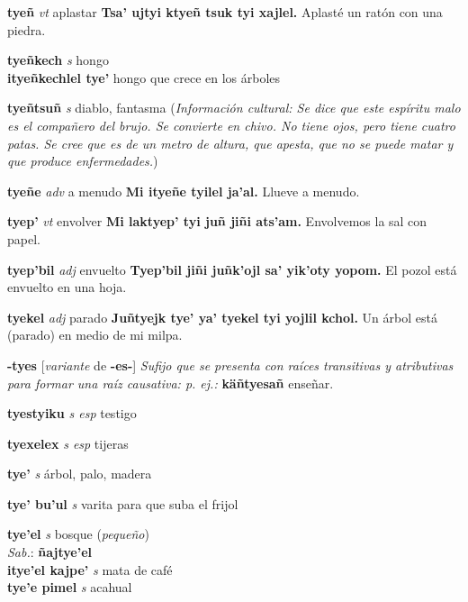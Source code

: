 \documentclass[10pt]{scrbook}
\newcommand{\entry}[1]{\textbf{#1}}
\newcommand{\nontranslationdef}[1]{\textit{#1}}
\newcommand{\partofspeech}[1]{\textit{#1}}
\newcommand{\spanishtranslation}[1]{#1}
\newcommand{\clarification}[1]{(\textit{#1})}
\newcommand{\cholexample}[1]{\textbf{#1}}
\newcommand{\exampletranslation}[1]{#1}
\newcommand{\dialectvariant}[1]{\\\textit{#1}:}
\newcommand{\dialectword}[1]{\textbf{#1}}
\newcommand{\culturalinformation}[1]{(\textit{#1})}
\newcommand{\secondaryentry}[1]{\\\textbf{#1}}
\newcommand{\secondpartofspeech}[1]{\textit{#1}}
\newcommand{\secondtranslation}[1]{#1}
\newcommand{\conjugationtense}[1]{[\textit{#1}}
\newcommand{\conjugationverb}[1]{de \textbf{#1}]}
\begin{document}
\begin{multicols}{2}
\entry{tyeñ}
\partofspeech{vt}
\spanishtranslation{aplastar}
\cholexample{Tsa' ujtyi ktyeñ tsuk tyi xajlel.}
\exampletranslation{Aplasté un ratón con una piedra.}

\entry{tyeñkech}
\partofspeech{s}
\spanishtranslation{hongo}
\secondaryentry{ityeñkechlel tye'}
\secondtranslation{hongo que crece en los árboles}

\entry{tyeñtsuñ}
\partofspeech{s}
\spanishtranslation{diablo, fantasma}
\culturalinformation{Información cultural: Se dice que este espíritu malo es el compañero del brujo. Se convierte en chivo. No tiene ojos, pero tiene cuatro patas. Se cree que es de un metro de altura, que apesta, que no se puede matar y que produce enfermedades.}

\entry{tyeñe}
\partofspeech{adv}
\spanishtranslation{a menudo}
\cholexample{Mi ityeñe tyilel ja'al.}
\exampletranslation{Llueve a menudo.}

\entry{tyep'}
\partofspeech{vt}
\spanishtranslation{envolver}
\cholexample{Mi laktyep' tyi juñ jiñi ats'am.}
\exampletranslation{Envolvemos la sal con papel.}

\entry{tyep'bil}
\partofspeech{adj}
\spanishtranslation{envuelto}
\cholexample{Tyep'bil jiñi juñk'ojl sa' yik'oty yopom.}
\exampletranslation{El pozol está envuelto en una hoja.}

\entry{tyekel}
\partofspeech{adj}
\spanishtranslation{parado}
\cholexample{Juñtyejk tye' ya' tyekel tyi yojlil kchol.}
\exampletranslation{Un árbol está (parado) en medio de mi milpa.}

\entry{-tyes}
\conjugationtense{variante}
\conjugationverb{-es-}
\nontranslationdef{Sufijo que se presenta con raíces transitivas y atributivas para formar una raíz causativa: p. ej.:}
\cholexample{käñtyesañ}
\exampletranslation{enseñar.}

\entry{tyestyiku}
\partofspeech{s esp}
\spanishtranslation{testigo}

\entry{tyexelex}
\partofspeech{s esp}
\spanishtranslation{tijeras}

\entry{tye'}
\partofspeech{s}
\spanishtranslation{árbol, palo, madera}

\entry{tye' bu'ul}
\partofspeech{s}
\spanishtranslation{varita para que suba el frijol}

\entry{tye'el}
\partofspeech{s}
\spanishtranslation{bosque}
\clarification{pequeño}
\dialectvariant{Sab.}
\dialectword{ñajtye'el}
\secondaryentry{itye'el kajpe'}
\secondpartofspeech{s}
\secondtranslation{mata de café}
\secondaryentry{tye'e pimel}
\secondpartofspeech{s}
\secondtranslation{acahual}


\end{multicols}
\end{document}
